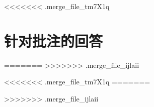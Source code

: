 <<<<<<< .merge_file_tm7X1q
\section{针对批注的回答}
\label{sec:fix}

=======
>>>>>>> .merge_file_ijlaii




<<<<<<< .merge_file_tm7X1q
=======

>>>>>>> .merge_file_ijlaii
\endinput